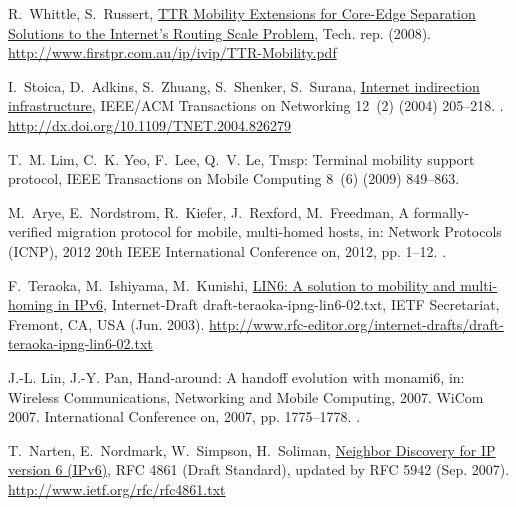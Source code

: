 \documentclass[preprint,12pt]{elsarticle}
\begin{document}
\begin{thebibliography}{10}
R.~Whittle, S.~Russert,
  \href{http://www.firstpr.com.au/ip/ivip/TTR-Mobility.pdf}{{TTR Mobility
  Extensions for Core-Edge Separation Solutions to the Internet's Routing Scale
  Problem}}, Tech. rep. (2008).
\newline\urlprefix\url{http://www.firstpr.com.au/ip/ivip/TTR-Mobility.pdf}

I.~Stoica, D.~Adkins, S.~Zhuang, S.~Shenker, S.~Surana,
  \href{http://dx.doi.org/10.1109/TNET.2004.826279}{Internet indirection
  infrastructure}, IEEE/ACM Transactions on Networking 12~(2) (2004) 205--218.
\newblock \href {http://dx.doi.org/10.1109/TNET.2004.826279}
  {}.
\newline\urlprefix\url{http://dx.doi.org/10.1109/TNET.2004.826279}

T.~M. Lim, C.~K. Yeo, F.~Lee, Q.~V. Le, Tmsp: Terminal mobility support
  protocol, IEEE Transactions on Mobile Computing 8~(6) (2009) 849--863.

M.~Arye, E.~Nordstrom, R.~Kiefer, J.~Rexford, M.~Freedman, A formally-verified
  migration protocol for mobile, multi-homed hosts, in: Network Protocols
  (ICNP), 2012 20th IEEE International Conference on, 2012, pp. 1--12.
\newblock \href {http://dx.doi.org/10.1109/ICNP.2012.6459961}
  {}.

F.~Teraoka, M.~Ishiyama, M.~Kunishi,
  \href{http://www.rfc-editor.org/internet-drafts/draft-teraoka-ipng-lin6-02.txt}{{LIN6}:
  A solution to mobility and multi-homing in {IPv6}}, Internet-Draft
  draft-teraoka-ipng-lin6-02.txt, IETF Secretariat, Fremont, CA, USA (Jun.
  2003).
\newline\urlprefix\url{http://www.rfc-editor.org/internet-drafts/draft-teraoka-ipng-lin6-02.txt}

J.-L. Lin, J.-Y. Pan, Hand-around: A handoff evolution with monami6, in:
  Wireless Communications, Networking and Mobile Computing, 2007. WiCom 2007.
  International Conference on, 2007, pp. 1775--1778.
\newblock \href {http://dx.doi.org/10.1109/WICOM.2007.445}
  {}.

T.~Narten, E.~Nordmark, W.~Simpson, H.~Soliman,
  \href{http://www.ietf.org/rfc/rfc4861.txt}{{Neighbor Discovery for IP version
  6 (IPv6)}}, RFC 4861 (Draft Standard), updated by RFC 5942 (Sep. 2007).
\newline\urlprefix\url{http://www.ietf.org/rfc/rfc4861.txt}


\end{thebibliography}
\end{document}
